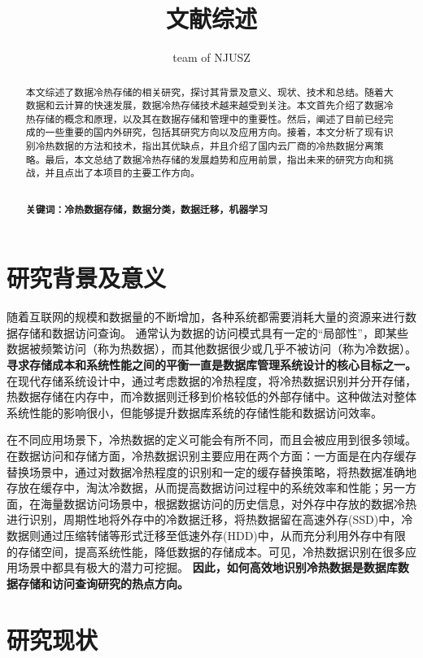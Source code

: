 \documentclass{article}
\title{文献综述}
\author{team of NJUSZ}
\begin{document}
\maketitle
\begin{abstract}
本文综述了数据冷热存储的相关研究，探讨其背景及意义、现状、技术和总结。随着大数据和云计算的快速发展，数据冷热存储技术越来越受到关注。本文首先介绍了数据冷热存储的概念和原理，以及其在数据存储和管理中的重要性。然后，阐述了目前已经完成的一些重要的国内外研究，包括其研究方向以及应用方向。接着，本文分析了现有识别冷热数据的方法和技术，指出其优缺点，并且介绍了国内云厂商的冷热数据分离策略。最后，本文总结了数据冷热存储的发展趋势和应用前景，指出未来的研究方向和挑战，并且点出了本项目的主要工作方向。

~\\
\textbf{关键词：冷热数据存储，数据分类，数据迁移，机器学习}

\end{abstract}

\section{研究背景及意义}
随着互联网的规模和数据量的不断增加，各种系统都需要消耗大量的资源来进行数据存储和数据访问查询。
通常认为数据的访问模式具有一定的“局部性”，即某些数据被频繁访问（称为热数据），而其他数据很少或几乎不被访问（称为冷数据）。
\textbf{寻求存储成本和系统性能之间的平衡一直是数据库管理系统设计的核心目标之一。}在现代存储系统设计中，通过考虑数据的冷热程度，将冷热数据识别并分开存储，热数据存储在内存中，而冷数据则迁移到价格较低的外部存储中。这种做法对整体系统性能的影响很小，但能够提升数据库系统的存储性能和数据访问效率。


在不同应用场景下，冷热数据的定义可能会有所不同，而且会被应用到很多领域。\textsuperscript{\cite{1}}在数据访问和存储方面，冷热数据识别主要应用在两个方面：一方面是在内存缓存替换场景中，通过对数据冷热程度的识别和一定的缓存替换策略，将热数据准确地存放在缓存中，淘汰冷数据，从而提高数据访问过程中的系统效率和性能；另一方面，在海量数据访问场景中，根据数据访问的历史信息，对外存中存放的数据冷热进行识别，周期性地将外存中的冷数据迁移，将热数据留在高速外存(SSD)中，冷数据则通过压缩转储等形式迁移至低速外存(HDD)中，从而充分利用外存中有限的存储空间，提高系统性能，降低数据的存储成本。可见，冷热数据识别在很多应用场景中都具有极大的潜力可挖掘。
\textbf{因此，如何高效地识别冷热数据是数据库数据存储和访问查询研究的热点方向。}

\section{研究现状}
\end{document}
